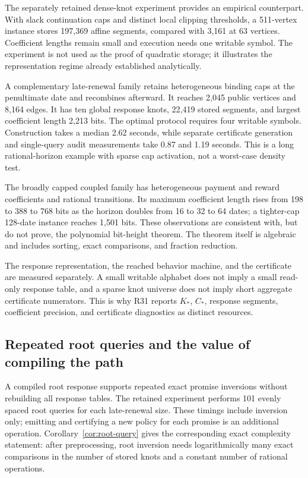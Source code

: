 The separately retained dense-knot experiment provides an empirical counterpart. With slack continuation caps and distinct local clipping thresholds, a 511-vertex instance stores 197,369 affine segments, compared with 3,161 at 63 vertices. Coefficient lengths remain small and execution needs one writable symbol. The experiment is not used as the proof of quadratic storage; it illustrates the representation regime already established analytically.

A complementary late-renewal family retains heterogeneous binding caps at the penultimate date and recombines afterward. It reaches 2,045 public vertices and 8,164 edges. It has ten global response knots, 22,419 stored segments, and largest coefficient length 2,213 bits. The optimal protocol requires four writable symbols. Construction takes a median 2.62 seconds, while separate certificate generation and single-query audit measurements take 0.87 and 1.19 seconds. This is a long rational-horizon example with sparse cap activation, not a worst-case density test.

The broadly capped coupled family has heterogeneous payment and reward coefficients and rational transitions. Its maximum coefficient length rises from 198 to 388 to 768 bits as the horizon doubles from 16 to 32 to 64 dates; a tighter-cap 128-date instance reaches 1,501 bits. These observations are consistent with, but do not prove, the polynomial bit-height theorem. The theorem itself is algebraic and includes sorting, exact comparisons, and fraction reduction.

The response representation, the reached behavior machine, and the certificate are measured separately. A small writable alphabet does not imply a small read-only response table, and a sparse knot universe does not imply short aggregate certificate numerators. This is why R31 reports $K_*$, $C_*$, response segments, coefficient precision, and certificate diagnostics as distinct resources.

\subsection{Repeated root queries and the value of compiling the path}
A compiled root response supports repeated exact promise inversions without rebuilding all response tables. The retained experiment performs 101 evenly spaced root queries for each late-renewal size. These timings include inversion only; emitting and certifying a new policy for each promise is an additional operation. Corollary~\ref{cor:root-query} gives the corresponding exact complexity statement: after preprocessing, root inversion needs logarithmically many exact comparisons in the number of stored knots and a constant number of rational operations.

